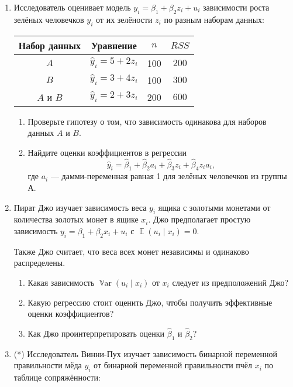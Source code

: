\documentclass[12pt]{article}
\DeclareMathOperator{\E}{\mathbb{E}}
\DeclareMathOperator{\Var}{\mathbb{V}ar}
\begin{document}
\newpage
\begin{enumerate}
    \item Исследователь оценивает модель $y_i = \beta_1 + \beta_2 z_i + u_i$ зависимости 
    роста зелёных человечков $y_i$ от их зелёности $z_i$ по разным наборам данных:

    \begin{tabular}{cccc}
        \toprule 
        Набор данных & Уравнение & $n$ & $RSS$ \\
        \midrule
        $A$ & $\hat y_i = 5 + 2 z_i$ & 100 & $200$ \\
        $B$ & $\hat y_i = 3 + 4 z_i$ & 100 & $300$ \\
        $A$ и $B$ & $\hat y_i = 2 + 3 z_i$ & 200 & $600$ \\
        \bottomrule
    \end{tabular}

    \begin{enumerate}
        \item Проверьте гипотезу о том, что зависимость одинакова для наборов данных $A$ и $B$.
        
        \item Найдите оценки коэффициентов в регрессии 
        \[
        \hat y_i = \hat\beta_1 + \hat\beta_2 a_i + \hat\beta_3 z_i + \hat\beta_4 z_i a_i,
        \]
        где $a_i$ — дамми-переменная равная 1 для зелёных человечков из группы А.
        
    \end{enumerate}

    \item Пират Джо изучает зависимость веса $y_i$ ящика с золотыми монетами от количества золотых монет в ящике $x_i$. 
    Джо предполагает простую зависимость $y_i = \beta_1 + \beta_2 x_i + u_i$ с $\E(u_i \mid x_i) = 0$.

    Также Джо считает, что веса всех монет независимы и одинаково распределены. 
    \begin{enumerate}
        \item Какая зависимость $\Var(u_i \mid x_i)$ от $x_i$ следует из предположений Джо?
        \item Какую регрессию стоит оценить Джо, чтобы получить эффективные оценки коэффициентов?
        \item Как Джо проинтерпретировать оценки $\hat\beta_1$ и $\hat\beta_2$?
    \end{enumerate}
    
    
\newpage
    \item (*) Исследователь Винни-Пух изучает зависимость бинарной переменной правильности мёда $y_i$ 
    от бинарной переменной правильности пчёл $x_i$ по таблице сопряжённости:


\end{enumerate}
\end{document}
